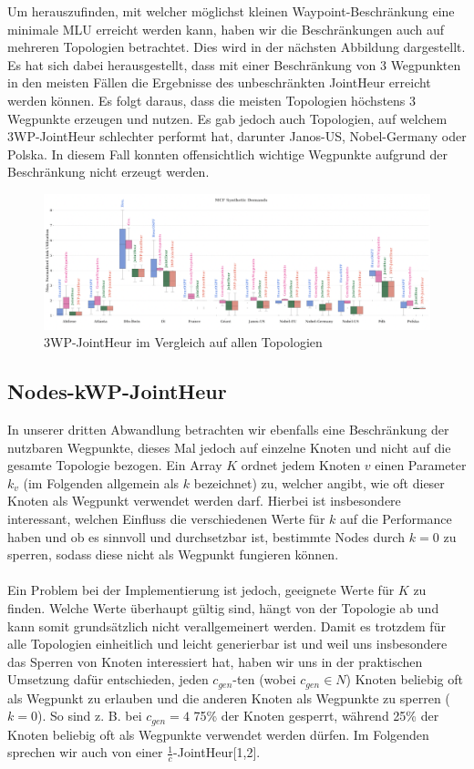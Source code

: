 \documentclass[sigconf,noacm,review]{acmart}
\begin{document}
Um herauszufinden, mit welcher möglichst kleinen Waypoint-Beschränkung eine minimale MLU erreicht werden kann, haben wir die Beschränkungen auch 
auf mehreren Topologien betrachtet. Dies wird in der nächsten Abbildung dargestellt. Es hat sich dabei herausgestellt, dass mit einer Beschränkung von 3 Wegpunkten in den meisten Fällen
die Ergebnisse des unbeschränkten JointHeur erreicht werden können. Es folgt daraus, dass die meisten Topologien höchstens 3 Wegpunkte erzeugen und nutzen.
Es gab jedoch auch Topologien, auf welchem  3WP-JointHeur schlechter performt hat, darunter Janos-US, Nobel-Germany oder Polska. In diesem Fall
konnten offensichtlich wichtige Wegpunkte aufgrund der Beschränkung nicht erzeugt werden.
\begin{figure}[h]
  \centering
  \includegraphics[width=\linewidth]{abbildungen/allTopologieskwp}
  \caption{3WP-JointHeur im Vergleich auf allen Topologien}
\end{figure}

\subsection{Nodes-kWP-JointHeur}
In unserer dritten Abwandlung betrachten wir ebenfalls eine Beschränkung der nutzbaren Wegpunkte, dieses Mal jedoch auf einzelne Knoten und nicht auf die gesamte Topologie bezogen.
Ein Array $K$ ordnet jedem Knoten $v$ einen Parameter $k_v$ (im Folgenden allgemein als $k$ bezeichnet) zu, welcher angibt, wie oft dieser Knoten als Wegpunkt verwendet werden darf. Hierbei ist insbesondere interessant, welchen Einfluss die verschiedenen Werte für $k$ auf die Performance haben und ob es sinnvoll und durchsetzbar ist, bestimmte Nodes durch $k=0$ zu sperren, sodass diese nicht als Wegpunkt fungieren können.
\\
\\
Ein Problem bei der Implementierung ist jedoch, geeignete Werte für $K$ zu finden. Welche Werte überhaupt gültig sind, hängt von der Topologie ab und kann somit grundsätzlich nicht verallgemeinert werden. Damit es trotzdem für alle Topologien einheitlich und leicht generierbar ist und weil uns insbesondere das Sperren von Knoten interessiert hat, haben wir uns in der praktischen Umsetzung dafür entschieden, jeden $c_{gen}$-ten (wobei $c_{gen} \in N$) Knoten beliebig oft als Wegpunkt zu erlauben und die anderen Knoten als Wegpunkte zu sperren ($k=0$). So sind z. B. bei  $c_{gen} = 4$ 75\% der Knoten gesperrt, während 25\% der Knoten beliebig oft als Wegpunkte verwendet werden dürfen. Im Folgenden sprechen wir auch von einer $\frac{1}{c}$-JointHeur[1,2].
\end{document}
